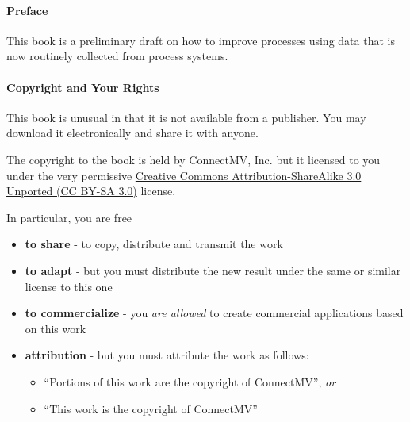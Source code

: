 \paragraph{Preface}





This book is a preliminary draft on how to improve processes using data that is now routinely collected from process systems.

\vskip24pt

\paragraph{Copyright and Your Rights}

This book is unusual in that it is not available from a publisher. You may download it electronically and share it with anyone.

The copyright to the book is held by ConnectMV, Inc. but it licensed to you under the very permissive \href{http://creativecommons.org/licenses/by-sa/3.0/}{Creative Commons Attribution-ShareAlike 3.0 Unported (CC BY-SA 3.0)} license.

In particular, you are free 
\begin{itemize}
	\item	\textbf{to share} - to copy, distribute and transmit the work
	\item	\textbf{to adapt} - but you must distribute the new result under the same or similar license to this one
	\item	\textbf{to commercialize} - you \emph{are allowed} to create commercial applications based on this work 
	\item	\textbf{attribution} - but you must attribute the work as follows:
	\begin{itemize}
		\item	``Portions of this work are the copyright of ConnectMV'', \emph{or}
		\item	``This work is the copyright of ConnectMV''
	\end{itemize}
\end{itemize}

